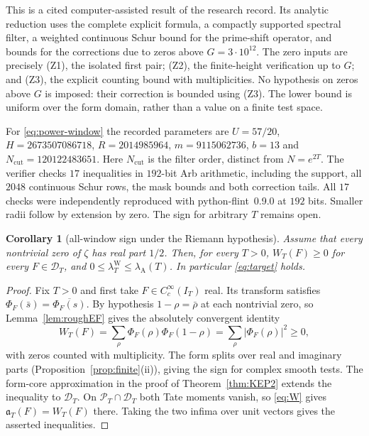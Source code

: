 \documentclass[11pt]{amsart}
\newtheorem{corollary}[theorem]{Corollary}
\theoremstyle{definition}
\theoremstyle{remark}
\newcommand{\PT}{\mathcal P_T}
\newcommand{\IT}{I_T}
\newcommand{\lamW}{\lambda^{\mathrm W}_T}
\newcommand{\lamA}{\lambda_{\mathrm A}(T)}
\begin{document}
This is a cited computer-assisted result of the research record. Its analytic reduction uses the complete
explicit formula, a compactly supported spectral filter, a weighted continuous Schur bound for the
prime-shift operator, and bounds for the corrections due to zeros above
$G=3\cdot10^{12}$. The zero inputs are precisely (Z1), the isolated first pair;
(Z2), the finite-height verification up to $G$; and (Z3), the explicit counting bound with multiplicities.
No hypothesis on zeros above $G$ is imposed: their correction is bounded using (Z3).
The lower bound is uniform over the form domain, rather than a value on a finite test space.

For \eqref{eq:power-window} the recorded parameters are
$U=57/20$, $H=2673507086718$, $R=2014985964$, $m=9115062736$, $b=13$ and
$N_{\mathrm{cut}}=120122483651$. Here $N_{\mathrm{cut}}$ is the filter order, distinct from $N=e^{2T}$.
The verifier checks $17$ inequalities in $192$-bit Arb arithmetic, including the support,
all $2048$ continuous Schur rows, the mask bounds and both correction tails.
All $17$ checks were independently reproduced with python-flint~0.9.0 at $192$ bits.
Smaller radii follow by extension by zero. The sign for arbitrary $T$ remains open.

\begin{corollary}[all-window sign under the Riemann hypothesis]\label{cor:rh-global-sign}
Assume that every nontrivial zero of $\zeta$ has real part $1/2$.
Then, for every $T>0$, $W_T(F)\ge0$ for every $F\in\mathcal D_T$, and
$0\le\lamW\le\lamA$. In particular \eqref{eq:target} holds.
\end{corollary}
\begin{proof}
Fix $T>0$ and first take $F\in C_c^\infty(\IT)$ real.
Its transform satisfies $\Phi_F(\bar s)=\overline{\Phi_F(s)}$.
By hypothesis $1-\rho=\bar\rho$ at each nontrivial zero, so
Lemma~\ref{lem:roughEF} gives the absolutely convergent identity
\[
 W_T(F)=\sum_{\rho}\Phi_F(\rho)\Phi_F(1-\rho)
       =\sum_{\rho}|\Phi_F(\rho)|^2\ge0,
\]
with zeros counted with multiplicity. The form splits over real and imaginary
parts (Proposition~\ref{prop:finite}(ii)), giving the sign for complex smooth tests.
The form-core approximation in the proof of Theorem~\ref{thm:KEP2} extends
the inequality to $\mathcal D_T$. On $\PT\cap\mathcal D_T$ both Tate moments
vanish, so \eqref{eq:W} gives $\mathfrak a_T(F)=W_T(F)$ there.
Taking the two infima over unit vectors gives the asserted inequalities.
\end{proof}
\end{document}
